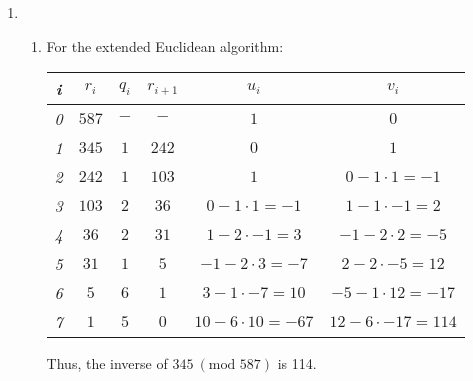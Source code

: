 {\begin{enumerate}
\begin{enumerate}[label=(\roman*)]
        \begin{align*}
            11^1 &\equiv 11 \ (\text{mod } 47) \\
            11^2 &\equiv 27 \ (\text{mod } 47) \\
            11^4 &\equiv 25 \ (\text{mod } 47) \\
            11^8 &\equiv 14 \ (\text{mod } 47) \\
            11^{16} &\equiv 8 \ (\text{mod } 47) \\
            11^{32} &\equiv 17 \ (\text{mod } 47)
        \end{align*}
        Now, we can calculate $11^{45} = 11^{32} \cdot 11^8 \cdot 11^4 \cdot 11 \equiv 17 \cdot 14 \cdot 25 \cdot 11 \ (\text{mod } 47)$. Further multiplying we get $17 \cdot 14 \ (\text{mod } 47) \equiv 3$. Then, $3 \cdot 25 \ (\text{mod } 47) \equiv 28$. And finally, $28 \cdot 11 \ (\text{mod } 47) \equiv 30$. Thus confirming our previous answer in (i).
    \end{enumerate}
%
%
%
%
%   
    \item \begin{enumerate}[label=(\roman*)]
        \item For the extended Euclidean algorithm:
        \begin{center}
        \begin{tabular}{c|c|c|c|c|c}
            \textit{i} & \textit{$r_i$} & \textit{$q_i$} & $r_{i + 1}$ & \textit{$u_i$} & \textit{$v_i$} \\ \hline
            \textit{0} & $587$ & $-$ & $-$ & $1$ & $0$ \\ \hline
            \textit{1} & $345$ & $1$ & $242$ & $0$ & $1$ \\ \hline
            \textit{2} & $242$ & $1$ & $103$ & $1$ & $0 - 1 \cdot 1 = -1$ \\ \hline
            \textit{3} & $103$ & $2$ & $36$ & $0 - 1 \cdot 1 = -1$ & $1 - 1 \cdot -1 = 2$ \\ \hline
            \textit{4} & $36$ & $2$ & $31$ & $1 - 2 \cdot -1 = 3$ & $-1 - 2 \cdot 2 = -5$ \\ \hline
            \textit{5} & $31$ & $1$ & $5$ & $-1 - 2 \cdot 3 = -7$ & $2 - 2 \cdot -5 = 12$ \\ \hline
            \textit{6} & $5$ & $6$ & $1$ & $3 - 1 \cdot -7 = 10$ & $-5 - 1 \cdot 12 = -17$ \\ \hline
            \textit{7} & $1$ & $5$ & $0$ & $10 - 6 \cdot 10 = -67$ & $12 - 6 \cdot -17 = 114$ 
        \end{tabular} 
        \end{center}
        Thus, the inverse of $345 \ (\text{mod } 587)$ is 114.
        

\end{enumerate}
\end{enumerate}}

